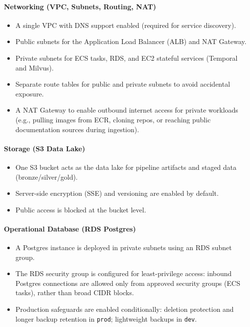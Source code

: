 \documentclass[a4paper,12pt]{article}
\begin{document}
\paragraph{Networking (VPC, Subnets, Routing, NAT)}
\begin{itemize}[leftmargin=*]
    \item A single VPC with DNS support enabled (required for service discovery).
    \item Public subnets for the Application Load Balancer (ALB) and NAT Gateway.
    \item Private subnets for ECS tasks, RDS, and EC2 stateful services (Temporal and Milvus).
    \item Separate route tables for public and private subnets to avoid accidental exposure.
    \item A NAT Gateway to enable outbound internet access for private workloads (e.g., pulling images from ECR, cloning repos, or reaching public documentation sources during ingestion).
\end{itemize}

\paragraph{Storage (S3 Data Lake)}
\begin{itemize}[leftmargin=*]
    \item One S3 bucket acts as the data lake for pipeline artifacts and staged data (bronze/silver/gold).
    \item Server-side encryption (SSE) and versioning are enabled by default.
    \item Public access is blocked at the bucket level.
\end{itemize}

\paragraph{Operational Database (RDS Postgres)}
\begin{itemize}[leftmargin=*]
    \item A Postgres instance is deployed in private subnets using an RDS subnet group.
    \item The RDS security group is configured for least-privilege access: inbound Postgres connections are allowed only from approved security groups (ECS tasks), rather than broad CIDR blocks.
    \item Production safeguards are enabled conditionally: deletion protection and longer backup retention in \texttt{prod}; lightweight backups in \texttt{dev}.
\end{itemize}
\end{document}
